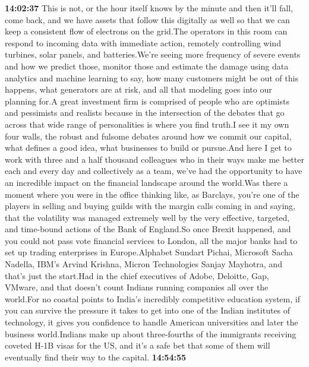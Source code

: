 \documentclass{article}%
\begin{document}
\textbf{14:02:37}%
\newline%
This is not, or the hour itself knows by the minute and then it'll fall, come back, and we have assets that follow this digitally as well so that we can keep a consistent flow of electrons on the grid.The operators in this room can respond to incoming data with immediate action, remotely controlling wind turbines, solar panels, and batteries.We're seeing more frequency of severe events and how we predict those, monitor those and estimate the damage using data analytics and machine learning to say, how many customers might be out of this happens, what generators are at risk, and all that modeling goes into our planning for.A great investment firm is comprised of people who are optimists and pessimists and realists because in the intersection of the debates that go across that wide range of personalities is where you find truth.I see it my own four walls, the robust and fulsome debates around how we commit our capital, what defines a good idea, what businesses to build or pursue.And here I get to work with three and a half thousand colleagues who in their ways make me better each and every day and collectively as a team, we've had the opportunity to have an incredible impact on the financial landscape around the world.Was there a moment where you were in the office thinking like, as Barclays, you're one of the players in selling and buying guilds with the margin calls coming in and saying, that the volatility was managed extremely well by the very effective, targeted, and time{-}bound actions of the Bank of England.So once Brexit happened, and you could not pass vote financial services to London, all the major banks had to set up trading enterprises in Europe.Alphabet Sundart Pichai, Microsoft Sacha Nadella, IBM's Arvind Krishna, Micron Technologies Sanjay Mayhotra, and that's just the start.Had in the chief executives of Adobe, Deloitte, Gap, VMware, and that doesn't count Indians running companies all over the world.For no coastal points to India's incredibly competitive education system, if you can survive the pressure it takes to get into one of the Indian institutes of technology, it gives you confidence to handle American universities and later the business world.Indians make up about three{-}fourths of the immigrants receiving coveted H{-}1B visas for the US, and it's a safe bet that some of them will eventually find their way to the capital.%
\textbf{14:54:55}%
\newline%
\end{document}
